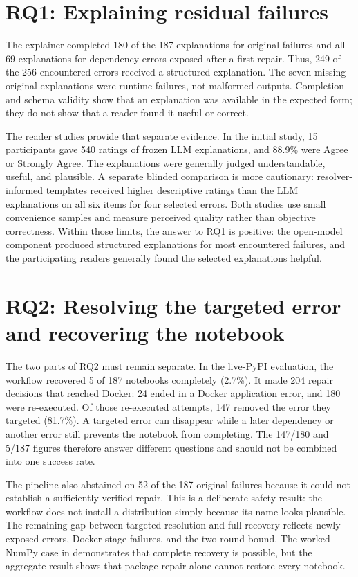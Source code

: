 \section*{RQ1: Explaining residual failures}

The explainer completed 180 of the 187 explanations for original failures and
all 69 explanations for dependency errors exposed after a first repair. Thus,
249 of the 256 encountered errors received a structured explanation. The seven
missing original explanations were runtime failures, not malformed outputs.
Completion and schema validity show that an explanation was available in the
expected form; they do not show that a reader found it useful or correct.

The reader studies provide that separate evidence. In the initial study, 15
participants gave 540 ratings of frozen LLM explanations, and 88.9\% were
Agree or Strongly Agree. The explanations were generally judged understandable,
useful, and plausible. A separate blinded comparison is more cautionary:
resolver-informed templates received higher descriptive ratings than the LLM
explanations on all six items for four selected errors. Both studies use small
convenience samples and measure perceived quality rather than objective
correctness. Within those limits, the answer to RQ1 is positive: the open-model
component produced structured explanations for most encountered failures, and
the participating readers generally found the selected explanations helpful.

\section*{RQ2: Resolving the targeted error and recovering the notebook}

The two parts of RQ2 must remain separate. In the live-PyPI evaluation, the
workflow recovered 5 of 187 notebooks completely (2.7\%). It made 204 repair
decisions that reached Docker: 24 ended in a Docker application error, and 180
were re-executed. Of those re-executed attempts, 147 removed the error they
targeted (81.7\%). A targeted error can disappear while a later dependency or
another error still prevents the notebook from completing. The 147/180 and
5/187 figures therefore answer different questions and should not be combined
into one success rate.

The pipeline also abstained on 52 of the 187 original failures because it
could not establish a sufficiently verified repair. This is a deliberate safety
result: the workflow does not install a distribution simply because its name
looks plausible. The remaining gap between targeted resolution and full
recovery reflects newly exposed errors, Docker-stage failures, and the
two-round bound. The worked NumPy case in  demonstrates
that complete recovery is possible, but the aggregate result shows that package
repair alone cannot restore every notebook.

